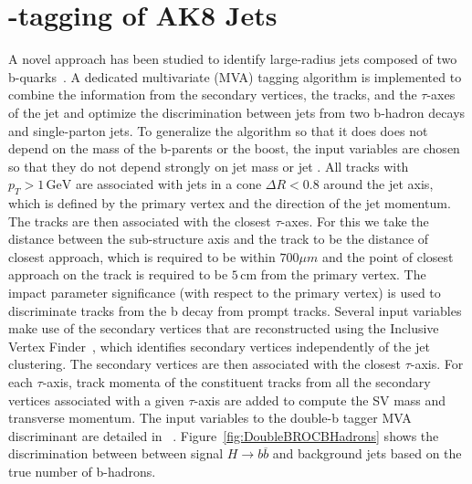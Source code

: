 \chapter{\bbbar-tagging of AK8 Jets}
\label{chap:bb}

A novel approach has been studied to identify large-radius jets composed of two b-quarks~\cite{CMS-PAS-BTV-15-002}. A dedicated multivariate (MVA) tagging algorithm is implemented to combine the information from the secondary vertices, the tracks, and the $\tau$-axes of the jet and optimize the discrimination between jets from two b-hadron decays and single-parton jets. To generalize the algorithm so that it does does not depend on the mass of the b-parents or the boost, the input variables are chosen so that they do not depend strongly on jet mass or jet \pt. All tracks with $p_{T}>1\,\textrm{GeV}$ are associated with jets in a cone $\Delta R<0.8$ around the jet axis, which is defined by the primary vertex and the direction of the jet momentum. The tracks are then associated with the closest $\tau$-axes. For this we take the distance between the sub-structure axis and the track to be the distance of closest approach, which is required to be within $700\mu m$ and the point of closest approach on the track is required to be $5\,\mathrm{cm}$ from the primary vertex. The impact parameter significance (with respect to the primary vertex) is used to discriminate tracks from the b decay from prompt tracks. Several input variables make use of the secondary vertices that are reconstructed using the Inclusive Vertex Finder~\cite{CMS-PAS-BTV-15-001}, which identifies secondary vertices independently of the jet clustering. The secondary vertices are then associated with the closest $\tau$-axis. For each $\tau$-axis, track momenta of the constituent tracks from all the secondary vertices associated with a given $\tau$-axis are added to compute the SV mass and transverse momentum.  The input variables to the double-b tagger MVA discriminant are detailed in ~\cite{CMS-PAS-BTV-15-002}.  Figure~\ref{fig:DoubleBROCBHadrons} shows the discrimination between between signal $H\rightarrow b\overline{b}$ and background jets based on the true number of b-hadrons.

